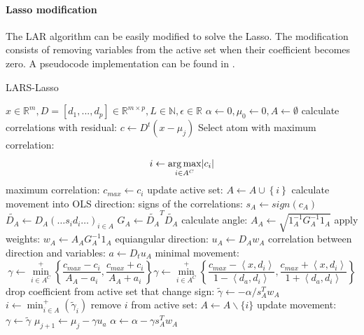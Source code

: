 \paragraph{Lasso modification}
The LAR algorithm can be easily modified to solve the Lasso. 
The modification consists of removing variables from the active set
when their coefficient becomes zero. A pseudocode implementation can be found
in .
\begin{algorithm}
\caption{LARS-Lasso}
\label{alg:lars}
\begin{algorithmic}[1]
\REQUIRE $x \in \mathbb{R}^m, D =[d_1,...,d_p] \in \mathbb{R}^{m\times p}, L \in
\mathbb{N}, \epsilon \in \mathbb{R}$
\STATE $\alpha \gets 0, \mu_{0} \gets 0, A \gets \emptyset$
\STATE calculate correlations with residual: $c \gets D^t\left( x-\mu_j \right)
$
\STATE Select atom with maximum correlation: 
\begin{equation*}
i \gets \argmax_{i \in A^C} \lvert c_i  \rvert %
\end{equation*}
\STATE maximum correlation: $c_{max} \gets c_i $ %
\STATE update active set: $A \gets A \cup \left\{i\right\} $
\STATE calculate movement into OLS direction:
\STATE signs of the correlations: $s_A \gets  sign\left(c_A\right)$
\STATE $\tilde{D_A} \gets D_A\left(\ldots s_id_i \ldots\right)_{i\in A}$
\STATE $G_A \gets \tilde{D_A}^T\tilde{D_A}$
\STATE calculate angle: $A_A \gets \sqrt{ 1_A^{-1} G_A^{-1} 1_A
}$
\STATE apply weights: $w_A \gets A_AG_A^{-1}1_A$
\STATE equiangular direction: $u_A \gets D_Aw_A$
\STATE correlation between direction and variables: $a \gets D_tu_A$
\STATE minimal movement:
\begin{equation*}
\gamma \gets \min_{i\in A^C}^{+} \left\lbrace \frac{c_{max}-c_i }{A_A-a_i },
\frac{c_{max}+c_i }{A_A+a_i } \right\rbrace
\gamma \gets \min_{i\in A^C}^{+} \left\lbrace \frac{c_{max}-\left< x,d_i
\right> }{1-\left< d_a,d_i \right> }, \frac{c_{max}+\left< x,d_i \right>
}{1+\left< d_a,d_i \right> } \right\rbrace
\end{equation*}
\STATE drop coefficient from active set that change sign: 
\STATE $ \tilde{\gamma} \gets -\alpha/s_A^Tw_A  $
\STATE $ i \gets \min_{i\in A}^{+} \left( \tilde{\gamma}_i \right) $
\STATE remove $i$ from active  set: $ A \gets A \backslash \{i\} $
\STATE update movement: $ \gamma \gets \tilde{\gamma} $  
\ENDIF
\STATE $ \mu_{j+1} \gets \mu_{j} - \gamma u_a $
\STATE $ \alpha \gets \alpha - \gamma s_A^Tw_A $
\ENDFOR
\end{algorithmic}
\end{algorithm}



